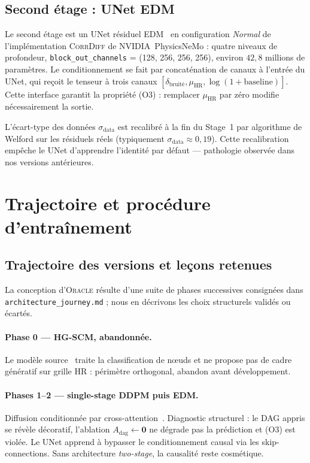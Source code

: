 \documentclass[14pt,a4paper,openany]{extreport}
\newcommand{\Oracle}{\textsc{Oracle}}
\newcommand{\CorrDiff}{\textsc{CorrDiff}}
\newcommand{\HR}{\ensuremath{\text{HR}}}
\newcommand{\muHR}{\ensuremath{\mu_{\HR}}}
\newcommand{\Adag}{\ensuremath{A_{\mathrm{dag}}}}
\begin{document}
\subsection{Second étage : UNet EDM}
\label{ssec:exp-topo-stage2}

Le second étage est un UNet résiduel EDM~\cite{karras_edm_2022} en configuration \emph{Normal} de l'implémentation \CorrDiff{} de NVIDIA~PhysicsNeMo : quatre niveaux de profondeur, \texttt{block\_out\_channels} = (128, 256, 256, 256), environ $42{,}8$ millions de paramètres. Le conditionnement se fait par concaténation de canaux à l'entrée du UNet, qui reçoit le tenseur à trois canaux $[\delta_{\mathrm{bruité}}, \muHR, \log(1 + \mathrm{baseline})]$. Cette interface garantit la propriété (O3) : remplacer $\muHR$ par zéro modifie nécessairement la sortie.

L'écart-type des données $\sigma_{\mathrm{data}}$ est recalibré à la fin du Stage~1 par algorithme de Welford sur les résiduels réels (typiquement $\sigma_{\mathrm{data}} \approx 0{,}19$). Cette recalibration empêche le UNet d'apprendre l'identité par défaut --- pathologie observée dans nos versions antérieures.

\section{Trajectoire et procédure d'entraînement}
\label{sec:exp-traj}

\subsection{Trajectoire des versions et leçons retenues}
\label{ssec:exp-traj-trajectoire}

La conception d'\Oracle{} résulte d'une suite de phases successives consignées dans \texttt{architecture\_journey.md} ; nous en décrivons les choix structurels validés ou écartés.

\paragraph{Phase 0 --- HG-SCM, abandonnée.} Le modèle source~\cite{lin_hgscm_2023} traite la classification de n\oe uds et ne propose pas de cadre génératif sur grille HR : périmètre orthogonal, abandon avant développement.

\paragraph{Phases 1--2 --- single-stage DDPM puis EDM.} Diffusion conditionnée par cross-attention~\cite{ho_ddpm_2020,karras_edm_2022}. Diagnostic structurel : le DAG appris se révèle décoratif, l'ablation $\Adag \leftarrow \mathbf{0}$ ne dégrade pas la prédiction et (O3) est violée. Le UNet apprend à bypasser le conditionnement causal via les skip-connections. Sans architecture \emph{two-stage}, la causalité reste cosmétique.
\end{document}
